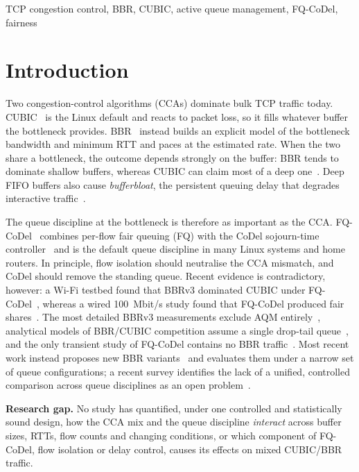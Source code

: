 \documentclass[conference]{IEEEtran}
\begin{document}
\begin{IEEEkeywords}
TCP congestion control, BBR, CUBIC, active queue management, FQ-CoDel, fairness
\end{IEEEkeywords}

\section{Introduction}
\label{sec:intro}

Two congestion-control algorithms (CCAs) dominate bulk TCP traffic today. CUBIC~\cite{ha2008cubic,rfc9438} is the Linux default and reacts to packet loss, so it fills whatever buffer the bottleneck provides. BBR~\cite{cardwell2017bbr} instead builds an explicit model of the bottleneck bandwidth and minimum RTT and paces at the estimated rate. When the two share a bottleneck, the outcome depends strongly on the buffer: BBR tends to dominate shallow buffers, whereas CUBIC can claim most of a deep one~\cite{hock2017bbr,cao2019bbr,ware2019modeling}. Deep FIFO buffers also cause \emph{bufferbloat}, the persistent queuing delay that degrades interactive traffic~\cite{gettys2012bufferbloat}.

The queue discipline at the bottleneck is therefore as important as the CCA. FQ-CoDel~\cite{rfc8290} combines per-flow fair queuing (FQ) with the CoDel sojourn-time controller~\cite{nichols2012codel,rfc8289} and is the default queue discipline in many Linux systems and home routers. In principle, flow isolation should neutralise the CCA mismatch, and CoDel should remove the standing queue. Recent evidence is contradictory, however: a Wi-Fi testbed found that BBRv3 dominated CUBIC under FQ-CoDel~\cite{shrestha2025wifi}, whereas a wired 100~Mbit/s study found that FQ-CoDel produced fair shares~\cite{sarpkaya2025l4s}. The most detailed BBRv3 measurements exclude AQM entirely~\cite{bless2025bbrv3}, analytical models of BBR/CUBIC competition assume a single drop-tail queue~\cite{sarpkaya2025sharing,scherrer2026control}, and the only transient study of FQ-CoDel contains no BBR traffic~\cite{kumari2025cubic}. Most recent work instead proposes new BBR variants~\cite{ahsan2026bbrn,han2026bbres,wang2025adbbr,mahmud2026startup} and evaluates them under a narrow set of queue configurations; a recent survey identifies the lack of a unified, controlled comparison across queue disciplines as an open problem~\cite{abrol2026survey}.

\textbf{Research gap.} No study has quantified, under one controlled and statistically sound design, how the CCA mix and the queue discipline \emph{interact} across buffer sizes, RTTs, flow counts and changing conditions, or which component of FQ-CoDel, flow isolation or delay control, causes its effects on mixed CUBIC/BBR traffic.
\end{document}

